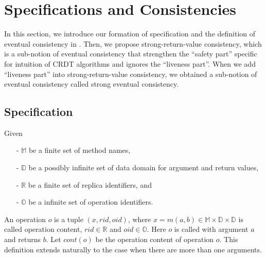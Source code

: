
\section{Specifications and Consistencies}
\label{sec:specifications and consistencies}

In this section, we introduce our formation of specification and the definition of eventual consistency in \cite{Bouajjani:2014}. Then, we propose strong-return-value consistency, which is a sub-notion of eventual consistency that strengthen the ``safety part'' specific for intuition of CRDT algorithms and ignores the ``liveness part''. When we add ``liveness part'' into strong-return-value consistency, we obtained a sub-notion of eventual consistency called strong eventual consistency.


\subsection{Specification}
\label{subsec:specification}

Given

\begin{itemize}
\setlength{\itemsep}{0.5pt}
\item[-] $\mathbb{M}$ be a finite set of method names,

\item[-] $\mathbb{D}$ be a possibly infinite set of data domain for argument and return values,

\item[-] $\mathbb{R}$ be a finite set of replica identifiers, and

\item[-] $\mathbb{O}$ be a infinite set of operation identifiers.
\end{itemize}

An operation $o$ is a tuple $(x,rid,oid)$, where $x =  m(a,b) \in \mathbb{M} \times \mathbb{D} \times \mathbb{D}$ is called operation content, $rid \in \mathbb{R}$ and $oid \in \mathbb{O}$. Here $o$ is called with argument $a$ and returns $b$. Let $cont(o)$ be the operation content of operation $o$. This definition extends naturally to the case when there are more than one arguments.

